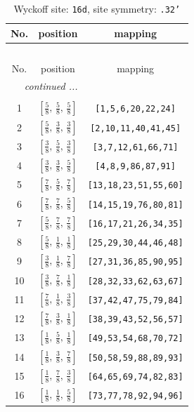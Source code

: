 \documentclass[fleqn,8pt]{jsarticle}
\begin{document}
\renewcommand{\arraystretch}{1.2}
\begin{longtable}{ccc}
\caption{Wyckoff site: {\tt 16d}, site symmetry: {\tt .32'}}
 \\
 \hline \hline
No. & position & mapping \\ \hline \endfirsthead

\multicolumn{2}{l}{\tablename\ \thetable{}} \\
 \hline \hline
No. & position & mapping \\ \hline \endhead

 \hline \hline
\multicolumn{2}{r}{\footnotesize\it continued ...} \\ \endfoot

 \hline \hline
\multicolumn{2}{r}{} \\ \endlastfoot

1 & $\left[ \frac{5}{8},\, \frac{5}{8},\, \frac{5}{8} \right]$ & {\tt [1,5,6,20,22,24]} \\ \hline
2 & $\left[ \frac{5}{8},\, \frac{3}{8},\, \frac{3}{8} \right]$ & {\tt [2,10,11,40,41,45]} \\ \hline
3 & $\left[ \frac{3}{8},\, \frac{5}{8},\, \frac{3}{8} \right]$ & {\tt [3,7,12,61,66,71]} \\ \hline
4 & $\left[ \frac{3}{8},\, \frac{3}{8},\, \frac{5}{8} \right]$ & {\tt [4,8,9,86,87,91]} \\ \hline
5 & $\left[ \frac{7}{8},\, \frac{5}{8},\, \frac{7}{8} \right]$ & {\tt [13,18,23,51,55,60]} \\ \hline
6 & $\left[ \frac{7}{8},\, \frac{7}{8},\, \frac{5}{8} \right]$ & {\tt [14,15,19,76,80,81]} \\ \hline
7 & $\left[ \frac{5}{8},\, \frac{7}{8},\, \frac{7}{8} \right]$ & {\tt [16,17,21,26,34,35]} \\ \hline
8 & $\left[ \frac{5}{8},\, \frac{1}{8},\, \frac{1}{8} \right]$ & {\tt [25,29,30,44,46,48]} \\ \hline
9 & $\left[ \frac{3}{8},\, \frac{1}{8},\, \frac{7}{8} \right]$ & {\tt [27,31,36,85,90,95]} \\ \hline
10 & $\left[ \frac{3}{8},\, \frac{7}{8},\, \frac{1}{8} \right]$ & {\tt [28,32,33,62,63,67]} \\ \hline
11 & $\left[ \frac{7}{8},\, \frac{1}{8},\, \frac{3}{8} \right]$ & {\tt [37,42,47,75,79,84]} \\ \hline
12 & $\left[ \frac{7}{8},\, \frac{3}{8},\, \frac{1}{8} \right]$ & {\tt [38,39,43,52,56,57]} \\ \hline
13 & $\left[ \frac{1}{8},\, \frac{5}{8},\, \frac{1}{8} \right]$ & {\tt [49,53,54,68,70,72]} \\ \hline
14 & $\left[ \frac{1}{8},\, \frac{3}{8},\, \frac{7}{8} \right]$ & {\tt [50,58,59,88,89,93]} \\ \hline
15 & $\left[ \frac{1}{8},\, \frac{7}{8},\, \frac{3}{8} \right]$ & {\tt [64,65,69,74,82,83]} \\ \hline
16 & $\left[ \frac{1}{8},\, \frac{1}{8},\, \frac{5}{8} \right]$ & {\tt [73,77,78,92,94,96]} \\
\end{longtable}
\end{document}
